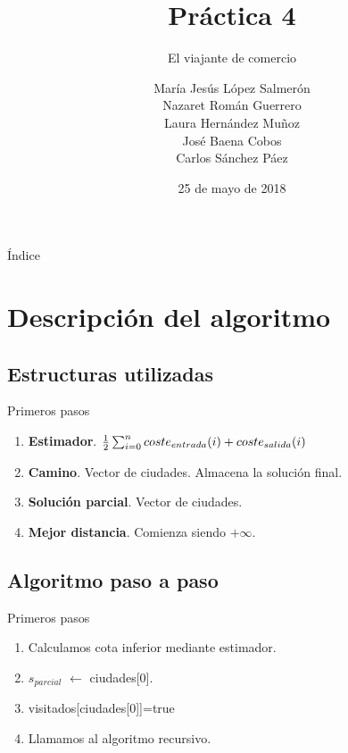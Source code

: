 \documentclass{beamer}
\title{Práctica 4}
\date{25 de mayo de 2018}
\subtitle{El viajante de comercio}
\author{María Jesús López Salmerón \\ Nazaret Román Guerrero \\ Laura Hernández Muñoz \\ José Baena Cobos  \\ Carlos Sánchez Páez}
\begin{document}
\centering
\begin{frame}
  \titlepage
\end{frame}

\begin{frame}{Índice}
  \tableofcontents
\end{frame}

\section{Descripción del algoritmo}

\subsection{Estructuras utilizadas}
\begin{frame}[fragile]{Primeros pasos}
\begin{enumerate}
	\item<+-> \textbf{Estimador}.
	$\centering \frac{1}{2} \sum_{i=0}^{n}coste_{entrada}(i)+coste_{salida}(i)$
	\item<+-> \textbf{Camino}. Vector de ciudades. Almacena la solución final.
	\item<+-> \textbf{Solución parcial}. Vector de ciudades.
	\item<+-> \textbf{Mejor distancia}. Comienza siendo $+\infty$.
\end{enumerate}
\end{frame}
\subsection{Algoritmo paso a paso}

\begin{frame}[fragile]{Primeros pasos}

\begin{enumerate}
	\item<+-> Calculamos cota inferior mediante estimador.
	\item<+-> $s_{parcial}$ $\leftarrow$ ciudades[0].
	\item<+-> visitados[ciudades[0]]=true
	\item<+-> Llamamos al algoritmo recursivo.
\end{enumerate}
\end{frame}
\end{document}
